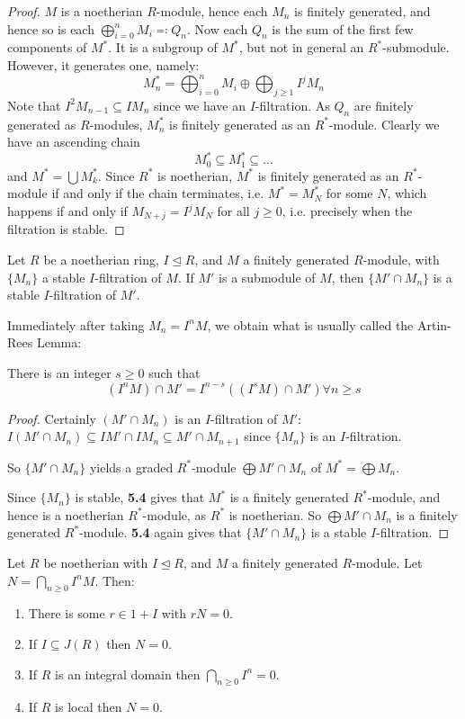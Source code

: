 \documentclass[10pt,a4paper]{article}
\begin{document}
\begin{proof}
  $M$ is a noetherian $R$-module, hence each $M_n$ is finitely generated, and hence so is each $\bigoplus_{i=0}^n M_i \eqqcolon Q_n$. Now each $Q_n$ is the sum of the first few components of $M^\ast$. It is a subgroup of $M^\ast$, but not in general an $R^\ast$-submodule. However, it generates one, namely:
  \[M^{\ast}_n = \bigoplus_{i=0}^n M_i \oplus \bigoplus_{j \geq 1} I^j M_n\]
  Note that $I^2M_{n-1} \subseteq IM_n$ since we have an $I$-filtration. As $Q_n$ are finitely generated as $R$-modules, $M_n^\ast$ is finitely generated as an $R^\ast$-module. Clearly we have an ascending chain
  \[M_0^\ast \subseteq M_1^\ast \subseteq \ldots\]
  and $M^\ast = \bigcup M_k^\ast$. Since $R^\ast$ is noetherian, $M^\ast$ is finitely generated as an $R^\ast$-module if and only if the chain terminates, i.e. $M^\ast = M^\ast_N$ for some $N$, which happens if and only if $M_{N+j} = I^jM_N$ for all $j \geq 0$, i.e. precisely when the filtration is stable.
\end{proof}
\begin{proposition}
  Let $R$ be a noetherian ring, $I \trianglelefteq R$, and $M$ a finitely generated $R$-module, with $\{M_n\}$ a stable $I$-filtration of $M$. If $M'$ is a submodule of $M$, then $\{M'\cap M_n\}$ is a stable $I$-filtration of $M'$.
\end{proposition}
Immediately after taking $M_n = I^nM$, we obtain what is usually called the Artin-Rees Lemma:
\begin{lemma}
  There is an integer $s \geq 0$ such that
  \[(I^n M)\cap M' = I^{n-s}((I^s M)\cap M') \forall n \geq s\]
\end{lemma}
\begin{proof}
  Certainly $(M' \cap M_n)$ is an $I$-filtration of $M'$: $I(M'\cap M_n) \subseteq IM' \cap IM_n \subseteq M' \cap M_{n+1}$ since $\{M_n\}$ is an $I$-filtration.

  So $\{M'\cap M_n\}$ yields a graded $R^\ast$-module $\bigoplus M'\cap M_n$ of $M^\ast = \bigoplus M_n$.

  Since $\{M_n\}$ is stable, \textbf{5.4} gives that $M^\ast$ is a finitely generated $R^\ast$-module, and hence is a noetherian $R^\ast$-module, as $R^\ast$ is noetherian. So $\bigoplus M' \cap M_n$ is a finitely generated $R^\ast$-module. \textbf{5.4} again gives that $\{M'\cap M_n\}$ is a stable $I$-filtration.
\end{proof}
\begin{proposition}
  Let $R$ be noetherian with $I \trianglelefteq R$, and $M$ a finitely generated $R$-module. Let $N = \bigcap_{n \geq 0} I^nM$. Then:
  \begin{enumerate}
    \item There is some $r \in 1+I$ with $rN = 0$.
    \item If $I \subseteq J(R)$ then $N = 0$.
    \item If $R$ is an integral domain then $\bigcap_{n\geq 0}I^n = 0$.
    \item If $R$ is local then $N = 0$.
  \end{enumerate}
\end{proposition}
\end{document}
